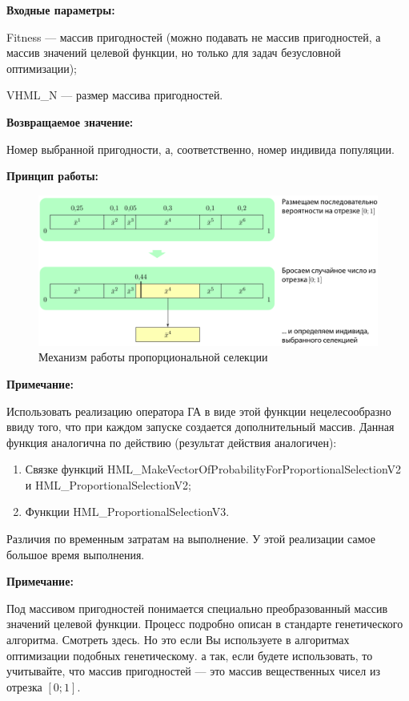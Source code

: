\textbf{Входные параметры:}
 
 Fitness --- массив пригодностей (можно подавать не массив пригодностей, а массив значений целевой функции, но только для задач безусловной оптимизации);
  
 VHML\_N --- размер массива пригодностей.

\textbf{Возвращаемое значение:} 

Номер выбранной пригодности, а, соответственно, номер индивида популяции.

 \textbf{Принцип работы:}

\begin{figure} [h]
  \center
  \includegraphics [scale=0.8] {HML_ProportionalSelection_Sheme}
  \caption{Механизм работы пропорциональной селекции} 
  \label{img:HML_ProportionalSelection_Sheme}  
\end{figure}

\textbf{Примечание:}

 Использовать реализацию оператора ГА в виде этой функции нецелесообразно ввиду того, что при каждом запуске создается дополнительный массив.  Данная функция аналогична по действию (результат действия аналогичен):
 
 \begin{enumerate}
\item Связке функций HML\_MakeVectorOfProbabilityForProportionalSelectionV2 и HML\_ProportionalSelectionV2;
\item Функции HML\_ProportionalSelectionV3.
 \end{enumerate}
 
Различия по временным затратам на выполнение. У этой реализации самое большое время выполнения.
  
\textbf{Примечание:}

 Под массивом пригодностей понимается специально преобразованный массив значений целевой функции. Процесс подробно описан в стандарте генетического алгоритма. Смотреть здесь. Но это если Вы используете в алгоритмах оптимизации подобных генетическому. а так, если будете использовать, то учитывайте, что массив пригодностей --- это массив вещественных чисел из отрезка $[0;1]$.
